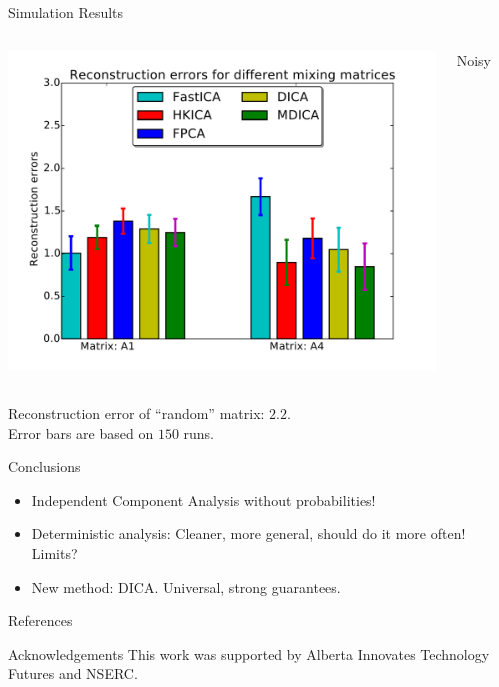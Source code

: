 \documentclass[final]{beamer} %
\newcommand{\bc}{\begin{center}}
\newcommand{\ec}{\end{center}}
\begin{document}
\begin{frame}[c]
\begin{columns}[t,totalwidth=\textwidth]
\begin{column}{0.32\textwidth}
\begin{block}{Simulation Results}
\begin{columns}[t]
			\includegraphics[width=\textwidth]{barchart-A1vsA4-noisy}
			\bc
			Noisy
			\ec
			\end{columns}		
			\bc
			Reconstruction error of ``random'' matrix: $2.2$.\\
			Error bars are based on $150$ runs.
			\ec
		\end{block}
		\vspace{0.5ex}
		\begin{block}{Conclusions}
			\begin{itemize}
			\item Independent Component Analysis without probabilities! 
			\item Deterministic analysis: Cleaner, more general, should do it more often! Limits?
			\item New method: DICA. Universal, strong guarantees.
			\end{itemize}
		\end{block}		
		\vspace{0.5ex}
		\begin{block}{References}
			\tiny
			
			
		\end{block}
		\vspace{0.5ex}
		\begin{block}{Acknowledgements}
			\small
			This work was supported by Alberta Innovates Technology Futures and NSERC.
		\end{block}
	\end{column}
		
	\begin{column}{0.01\textwidth}
	\end{column}
\end{columns}
 
\end{frame}
\end{document}
